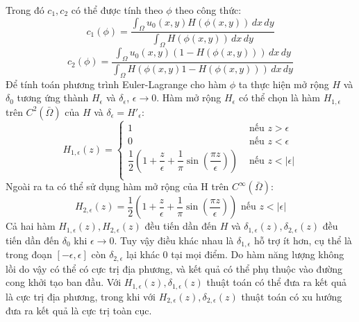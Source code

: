 \documentclass[14pt,oneside,a4paper]{extreport}
\begin{document}
Trong đó $c_1, c_2$ có thể được tính theo $\phi$ theo công thức:
\begin{equation*}
c_1(\phi)=\dfrac{\int_{\Omega}u_0(x,y)H(\phi(x,y))\,dx \,dy}{\int_{\Omega}H(\phi(x,y))\,dx\,dy}
\end{equation*}
\begin{equation*}
c_2(\phi)=\dfrac{\int_{\Omega}u_0(x,y)(1-H(\phi(x,y)))\,dx \,dy}{\int_{\Omega}H(\phi(x,y)1-H(\phi(x,y)))\,dx\,dy}
\end{equation*}
Để tính toán phương trình Euler-Lagrange cho hàm $\phi$ ta thực hiện mở rộng $H$ và $\delta_0$ tương ứng thành  $H_{\epsilon}$ và $\delta_{\epsilon}$, $\epsilon \rightarrow 0$. Hàm mở rộng $H_{\epsilon}$ có thể chọn là hàm $H_{1,{\epsilon}}$ trên $C^2(\bar{\Omega})$ của $H$ và $\delta_{\epsilon}=H'_{\epsilon}$:
\begin{equation*}
 H_{1,\epsilon}(z)=
\begin{cases}
 1 & \text{ nếu } z> \epsilon\\
0 & \text{ nếu } z <\epsilon \\
\dfrac{1}{2}(1+\dfrac{z}{\epsilon}+\dfrac{1}{\pi}\sin(\dfrac{\pi z}{\epsilon})) & \text{ nếu } z <|\epsilon|\\
   \end{cases}
\end{equation*}
Ngoài ra ta có thể sử dụng hàm mở rộng của H trên $C^{\infty}(\bar{\Omega})$:
\begin{equation*}
 H_{2,\epsilon}(z)=\dfrac{1}{2}(1+\dfrac{z}{\epsilon}+\dfrac{1}{\pi}\sin(\dfrac{\pi z}{\epsilon}))  \text{ nếu } z <|\epsilon|
\end{equation*}
Cả hai hàm $ H_{1,\epsilon}(z),  H_{2,\epsilon}(z)$ đều tiến dần đến $H$ và $ \delta_{1,\epsilon}(z),  \delta_{2,\epsilon}(z)$ đều tiến dần đến $\delta_0$ khi $\epsilon\rightarrow 0$. Tuy vậy điều khác nhau là $ \delta_{1,\epsilon}$ hỗ trợ ít hơn, cụ thể là trong đoạn $[-\epsilon, \epsilon]$ còn $ \delta_{2,\epsilon}$ lại khác 0 tại mọi điểm. Do hàm năng lượng không lồi do vậy có thể có cực trị địa phương, và kết quả có thể phụ thuộc vào đường cong khởi tạo ban đầu. Với $H_{1,\epsilon}(z), \delta_{1,\epsilon}(z)$ thuật toán có thể đưa ra kết quả là cực trị địa phương, trong khi với $H_{2,\epsilon}(z), \delta_{2,\epsilon}(z)$ thuật toán có xu hướng đưa ra kết quả là cực trị toàn cục.
\end{document}
